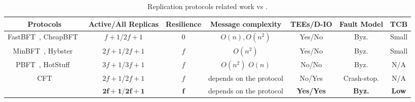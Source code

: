 \begin{table}[t]
\fontsize{7}{10}\selectfont 

\begin{center}
\begin{tabular}{ |c|c|c|c|c|c|c| } 
 \hline
 Protocols & Active/All Replicas & Resilience & Message complexity & TEEs/D-IO & Fault Model & TCB \\ [0.5ex] \hline \hline
 FastBFT~\cite{DBLP:journals/corr/LiuLKA16a}, CheapBFT~\cite{10.1145/2168836.2168866} & $f+1$/$2f+1$ & $0$ & $O(n), O(n^2)$ & Yes/No & Byz. & Small\\
 MinBFT~\cite{minBFT}, Hybster~\cite{hybster} & $2f+1$/$2f+1$ & $f$ &  $O(n^2)$ & Yes/No & Byz. & Small\\
 PBFT~\cite{Castro:2002}, HotStuff~\cite{DBLP:journals/corr/abs-1803-05069} & $3f+1$/$3f+1$ & $f$ & $O(n^2)$ $O(n)$ & No/No & Byz. & N/A\\
 CFT & $2f+1$/$2f+1$ & $f$ & depends on the protocol & No/Yes & Crash-stop. & N/A\\
 {\bf \projecttitle{}} & $\mathbf{2f+1}$/$\mathbf{2f+1}$ & ${\mathbf{f}}$ & depends on the protocol & \bf{Yes}/\bf{Yes} & \bf{Byz.} & \bf{Low}\\ 
 \hline
\end{tabular}
\end{center}
\caption{Replication protocols related work vs \projecttitle{}.}
\label{tab:recipe_vs_bft}
\vspace{0pt}
\end{table}








